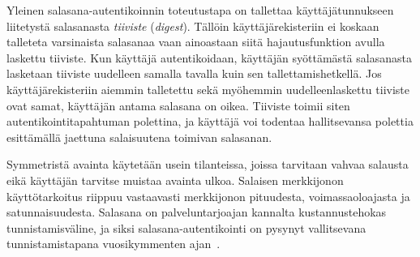 \documentclass[finnish,gradu]{tktltiki}
\begin{document}
  Yleinen salasana-autentikoinnin toteutustapa on tallettaa käyttäjätunnukseen liitetystä salasanasta \emph{tiiviste} (\emph{digest}). Tällöin käyttäjärekisteriin ei koskaan talleteta varsinaista salasanaa vaan ainoastaan siitä hajautusfunktion avulla laskettu tiiviste. Kun käyttäjä autentikoidaan, käyttäjän syöttämästä salasanasta lasketaan tiiviste uudelleen samalla tavalla kuin sen tallettamishetkellä. Jos käyttäjärekisteriin aiemmin talletettu sekä myöhemmin uudelleenlaskettu tiiviste ovat samat, käyttäjän antama salasana on oikea. Tiiviste toimii siten autentikointitapahtuman polettina, ja käyttäjä voi todentaa hallitsevansa polettia esittämällä jaettuna salaisuutena toimivan salasanan.

  Symmetristä avainta käytetään usein tilanteissa, joissa tarvitaan vahvaa salausta eikä käyttäjän tarvitse muistaa avainta ulkoa. Salaisen merkkijonon käyttötarkoitus riippuu vastaavasti merkkijonon pituudesta, voimassaoloajasta ja satunnaisuudesta. Salasana on palveluntarjoajan kannalta kustannustehokas tunnistamisväline, ja siksi salasana-autentikointi on pysynyt vallitsevana tunnistamistapana vuosikymmenten ajan~\cite{pw_auth_system_perspective_08}.


\end{document}
